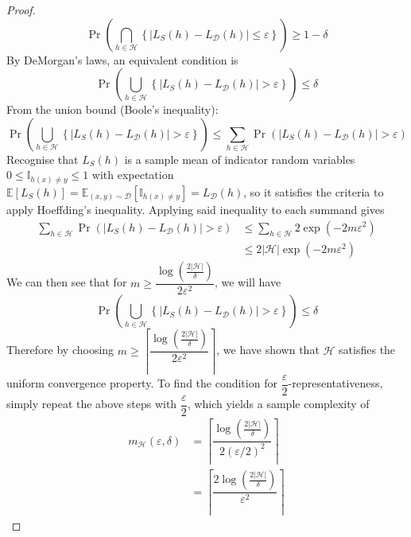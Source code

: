 \documentclass[11pt]{report} %
\begin{document}
\begin{proof}
\begin{equation}
\operatorname{Pr}\left(\bigcap_{h\in\mathcal{H}}\left\{\left|L_{S}\left(h\right) - L_{\mathcal{D}}\left(h\right)\right| \leq \varepsilon\right\}\right) \geq 1 - \delta
\end{equation}
By DeMorgan's laws, an equivalent condition is
\begin{equation}
\operatorname{Pr}\left(\bigcup_{h\in\mathcal{H}}\left\{\left|L_{S}\left(h\right) - L_{\mathcal{D}}\left(h\right)\right| > \varepsilon\right\}\right) \leq  \delta
\end{equation}
From the union bound (Boole's inequality):
\begin{equation}
\operatorname{Pr}\left(\bigcup_{h\in\mathcal{H}}\left\{\left|L_{S}\left(h\right) - L_{\mathcal{D}}\left(h\right)\right| > \varepsilon\right\}\right) \leq  \sum_{h\in\mathcal{H}}\operatorname{Pr}\left(\left|L_{S}\left(h\right) - L_{\mathcal{D}}\left(h\right)\right| > \varepsilon\right)
\end{equation}
Recognise that $L_{S}\left(h\right)$ is a sample mean of indicator random variables $0 \leq \mathbb{I}_{h\left(x\right) \neq y} \leq 1$ with expectation $\mathbb{E}\left[L_{S}\left(h\right)\right] = \mathbb{E}_{\left(x, y\right)\sim\mathcal{D}}\left[\mathbb{I}_{h\left(x\right) \neq y}\right] = L_{\mathcal{D}}\left(h\right)$, so it satisfies the criteria to apply Hoeffding's inequality. Applying said inequality to each summand gives
\begin{align}
\sum_{h\in\mathcal{H}}\operatorname{Pr}\left(\left|L_{S}\left(h\right) - L_{\mathcal{D}}\left(h\right)\right| > \varepsilon\right) &\leq \sum_{h\in\mathcal{H}}2\exp\left(-2m\varepsilon^{2}\right) \\
&\leq 2\left|\mathcal{H}\right|\exp\left(-2m\varepsilon^{2}\right)
\end{align}
We can then see that for $m \geq \dfrac{\log\left(\frac{2\left|\mathcal{H}\right|}{\delta}\right)}{2\varepsilon^{2}}$, we will have
\begin{equation}
\operatorname{Pr}\left(\bigcup_{h\in\mathcal{H}}\left\{\left|L_{S}\left(h\right) - L_{\mathcal{D}}\left(h\right)\right| > \varepsilon\right\}\right) \leq  \delta
\end{equation}
Therefore by choosing $m \geq \left\lceil\dfrac{\log\left(\frac{2\left|\mathcal{H}\right|}{\delta}\right)}{2\varepsilon^{2}}\right\rceil$, we have shown that $\mathcal{H}$ satisfies the uniform convergence property. To find the condition for $\dfrac{\varepsilon}{2}$-representativeness, simply repeat the above steps with $\dfrac{\varepsilon}{2}$, which yields a sample complexity of
\begin{align}
m_{\mathcal{H}}\left(\varepsilon, \delta\right) &= \left\lceil\dfrac{\log\left(\frac{2\left|\mathcal{H}\right|}{\delta}\right)}{2\left(\varepsilon/2\right)^{2}}\right\rceil \\
&= \left\lceil\dfrac{2\log\left(\frac{2\left|\mathcal{H}\right|}{\delta}\right)}{\varepsilon^{2}}\right\rceil
\end{align}

\end{proof}
\end{document}
